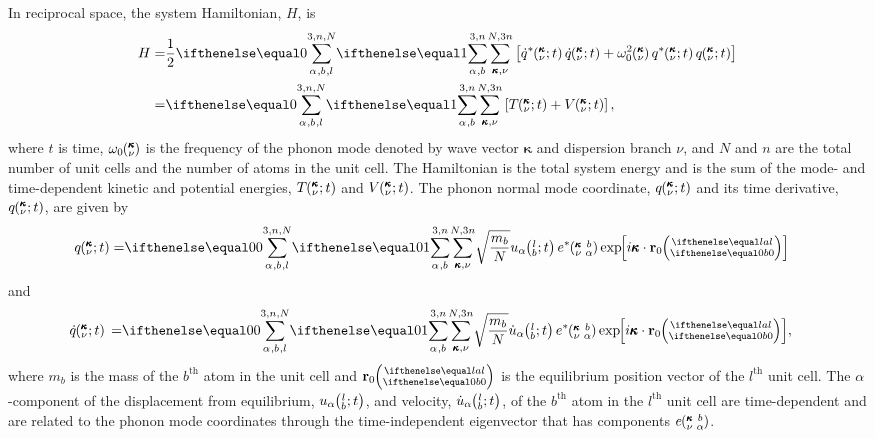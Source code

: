 In reciprocal space, the system Hamiltonian, $H$, is
\begin{equation}\label{E:H_HLD}
\begin{split}
H=&\frac{1}{2}\SUM{}{}\left[\dot{q}^*\kvt \dot{q}\kvt + \omega_0^2\kv 
q^*\kvt q\kvt\right]\\
 =&\SUM{}{}\left[T\kvt + V\kvt\right],
 \end{split}
\end{equation}
where $t$ is time, $\omega_0\kv$ is the frequency of the phonon mode 
denoted by
wave vector $\pmb{\kappa}$ and dispersion branch $\nu$, and $N$ and 
$n$ are
the total number of unit cells and the number of atoms in the unit cell.
The
Hamiltonian is the total system energy and is the sum of the mode- and
time-dependent kinetic and potential energies, $T\kvt$ and $V\kvt$.  The
phonon normal mode coordinate, $q\kvt$ and its time derivative, 
$q\kvt$, are given by
\begin{equation}\label{E:q_HLD}
\begin{split}
q\kvt=&\SUM{0}{}\sqrt{\frac{m_b}{N}}u_{\alpha}\lbt e^*\kvba
\EXP{i\pmb{\kappa}\cdot\mathbf{r}_0\ab{l}{0}}
\end{split}
\end{equation}
and
\begin{equation}\label{E:qdot_HLD}
\begin{split}
\dot{q}\kvt{}{}{}=&\SUM{0}{}\sqrt{\frac{m_b}{N}}\dot{u}_{\alpha}\lbt
e^*\kvba\EXP{i\pmb{\kappa}\cdot\mathbf{r}_0\ab{l}{0}},
\end{split}
\end{equation}
where $m_b$ is the mass of the $b^{\textrm{th}}$ atom in the unit cell and
$\mathbf{r}_0\ab{l}{0}$ is the equilibrium position vector of the
$l^{\textrm{th}}$ unit cell. The $\alpha$-component of the displacement from
equilibrium, $u_{\alpha}\lbt$, and velocity, $\dot{u}_{\alpha}\lbt$, of the
$b^{\textrm{th}}$ atom in the $l^{\textrm{th}}$ unit cell are time-dependent
and are related to the phonon mode coordinates through the time-independent
eigenvector that has components $e\kvba$.

